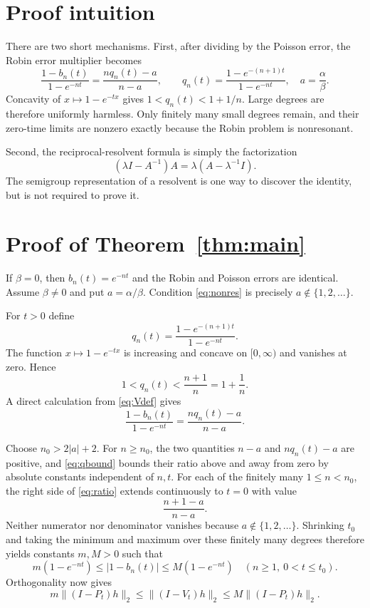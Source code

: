 \documentclass[11pt]{article}
\begin{document}
\section{Proof intuition}

There are two short mechanisms.  First, after dividing by the Poisson error,
the Robin error multiplier becomes
\[
 \frac{1-b_n(t)}{1-e^{-nt}}
 =\frac{nq_n(t)-a}{n-a},\qquad
 q_n(t)=\frac{1-e^{-(n+1)t}}{1-e^{-nt}},\quad a=\frac\alpha\beta.
\]
Concavity of $x\mapsto1-e^{-tx}$ gives
$1<q_n(t)<1+1/n$.  Large degrees are therefore uniformly harmless.  Only
finitely many small degrees remain, and their zero-time limits are nonzero
exactly because the Robin problem is nonresonant.

Second, the reciprocal-resolvent formula is simply the factorization
\[
 (\lambda I-A^{-1})A=\lambda(A-\lambda^{-1}I).
\]
The semigroup representation of a resolvent is one way to discover the
identity, but is not required to prove it.

\section{Proof of Theorem~\ref{thm:main}}

If $\beta=0$, then $b_n(t)=e^{-nt}$ and the Robin and Poisson errors are
identical.  Assume $\beta\neq0$ and put $a=\alpha/\beta$.  Condition
\eqref{eq:nonres} is precisely $a\notin\{1,2,\ldots\}$.

For $t>0$ define
\[
 q_n(t)=\frac{1-e^{-(n+1)t}}{1-e^{-nt}}.
\]
The function $x\mapsto1-e^{-tx}$ is increasing and concave on $[0,\infty)$
and vanishes at zero.  Hence
\begin{equation}\label{eq:qbound}
 1<q_n(t)<\frac{n+1}{n}=1+\frac1n.
\end{equation}
A direct calculation from \eqref{eq:Vdef} gives
\begin{equation}\label{eq:ratio}
 \frac{1-b_n(t)}{1-e^{-nt}}=\frac{nq_n(t)-a}{n-a}.
\end{equation}

Choose $n_0>2|a|+2$.  For $n\geq n_0$, the two quantities $n-a$ and
$nq_n(t)-a$ are positive, and \eqref{eq:qbound} bounds their ratio above and
away from zero by absolute constants independent of $n,t$.  For each of the
finitely many $1\leq n<n_0$, the right side of \eqref{eq:ratio} extends
continuously to $t=0$ with value
\[
 \frac{n+1-a}{n-a}.
\]
Neither numerator nor denominator vanishes because
$a\notin\{1,2,\ldots\}$.  Shrinking
$t_0$ and taking the minimum and maximum over these finitely many degrees
therefore yields constants $m,M>0$ such that
\begin{equation}\label{eq:scalarcomp}
 m(1-e^{-nt})\leq |1-b_n(t)|\leq M(1-e^{-nt})
 \quad(n\geq1,\ 0<t\leq t_0).
\end{equation}
Orthogonality now gives
\begin{equation}\label{eq:poissoncomp}
 m\|(I-P_t)h\|_2\leq\|(I-V_t)h\|_2
 \leq M\|(I-P_t)h\|_2.
\end{equation}
\end{document}
